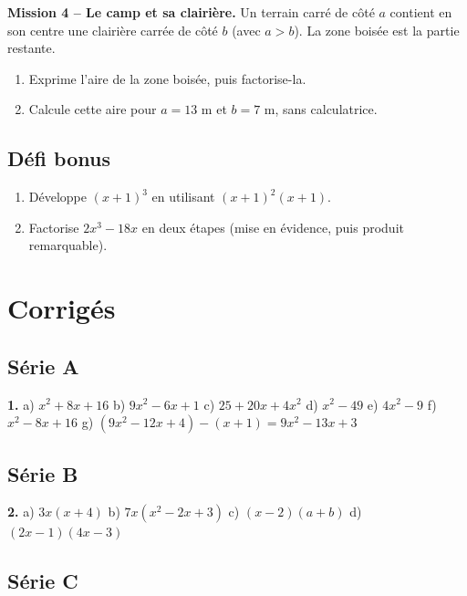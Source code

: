\documentclass[../main.tex]{subfiles}
\begin{document}
\textbf{Mission 4 -- Le camp et sa clairière.}
Un terrain carré de côté $a$ contient en son centre une clairière carrée de côté $b$ (avec $a > b$). La zone boisée est la partie restante.
\begin{enumerate}[label=\alph*)]
  \item Exprime l'aire de la zone boisée, puis factorise-la.
  \item Calcule cette aire pour $a = 13$ m et $b = 7$ m, sans calculatrice.
\end{enumerate}

\subsection{Défi bonus}

\begin{enumerate}[label=\alph*)]
  \item Développe $(x + 1)^3$ en utilisant $(x+1)^2(x+1)$.
  \item Factorise $2x^3 - 18x$ en deux étapes (mise en évidence, puis produit remarquable).
\end{enumerate}

\newpage
\section{Corrigés}

\subsection*{Série A}

\textbf{1.} a) $x^2 + 8x + 16$ \quad b) $9x^2 - 6x + 1$ \quad c) $25 + 20x + 4x^2$ \quad d) $x^2 - 49$ \quad e) $4x^2 - 9$ \quad f) $x^2 - 8x + 16$ \quad g) $(9x^2 - 12x + 4) - (x + 1) = 9x^2 - 13x + 3$

\subsection*{Série B}

\textbf{2.} a) $3x(x + 4)$ \quad b) $7x(x^2 - 2x + 3)$ \quad c) $(x - 2)(a + b)$ \quad d) $(2x - 1)(4x - 3)$

\subsection*{Série C}
\end{document}
